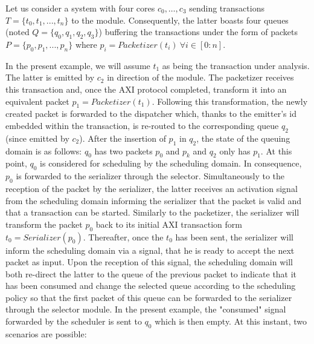 Let us consider a system with four cores $c_0, \ldots, c_3$ sending
transactions $T = \{t_{0}, t_{1}, ..., t_{n}\}$ to the \schim module.
Consequently, the latter boasts four queues (noted $Q = \{q_{0},
q_{1}, q_{2}, q_{3}\}$) buffering the transactions under the form of
packets $P = \{p_{0}, p_{1}, ..., p_{n}\}$ where $p_{i} =
Packetizer(t_{i})~\forall i \in [0 : n]$.

In the present example, we will assume $t_{1}$ as being the
transaction under analysis.  The latter is emitted by $c_{2}$ in
direction of the \schim module.  The packetizer receives this
transaction and, once the AXI protocol completed, transform it into an
equivalent packet $p_{1} = Packetizer(t_{1})$.  Following this
transformation, the newly created packet is forwarded to the
dispatcher which, thanks to the emitter's id embedded within the
transaction, is re-routed to the corresponding queue $q_{2}$ (since
emitted by $c_{2}$).  After the insertion of $p_{1}$ in $q_{2}$, the
state of the queuing domain is as follows: $q_{0}$ has two packets
$p_{0}$ and $p_{k}$ and $q_{2}$ only has $p_{1}$.  At this point,
$q_{0}$ is considered for scheduling by the scheduling domain.  In
consequence, $p_{0}$ is forwarded to the serializer through the
selector.  Simultaneously to the reception of the packet by the
serializer, the latter receives an activation signal from the
scheduling domain informing the serializer that the packet is valid
and that a transaction can be started.  Similarly to the packetizer,
the serializer will transform the packet $p_{0}$ back to its initial
AXI transaction form $t_{0} = Serializer(p_{0})$.  Thereafter, once
the $t_{0}$ has been sent, the serializer will inform the scheduling
domain via a signal, that he is ready to accept the next packet as
input.  Upon the reception of this signal, the scheduling domain will
both re-direct the latter to the queue of the previous packet to
indicate that it has been consumed and change the selected queue
according to the scheduling policy so that the first packet of this
queue can be forwarded to the serializer through the selector module.
In the present example, the "consumed" signal forwarded by the
scheduler is sent to $q_{0}$ which is then empty.  At this instant,
two scenarios are possible:

